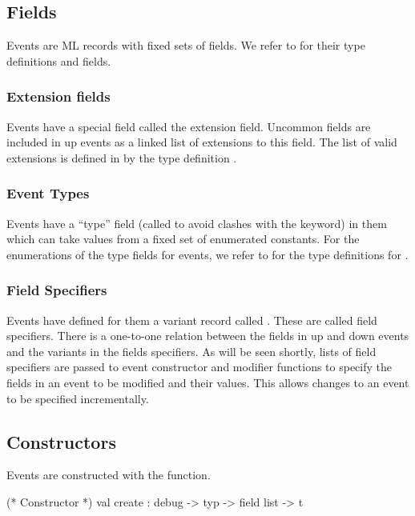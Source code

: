 \subsection{Fields}
Events are ML records with fixed sets of fields.  We refer to
 for their type definitions and fields.

\subsubsection{Extension fields}
Events have a special field called the extension field.  Uncommon
fields are included in up events as a linked list of extensions to
this field.  The list of valid extensions is defined in
 by the type definition .

\subsubsection{Event Types}
Events have a ``type'' field (called  to avoid clashes with
the  keyword) in them which can take values from a fixed
set of enumerated constants.  For the enumerations of the type fields
for events, we refer to  for the type
definitions for .

\subsubsection{Field Specifiers}
Events have defined for them a variant record called .
These are called field specifiers.  There is a one-to-one relation
between the fields in up and down events and the variants in the
fields specifiers.  As will be seen shortly, lists of field specifiers
are passed to event constructor and modifier functions to specify the
fields in an event to be modified and their values.  This allows
changes to an event to be specified incrementally.

\subsection{Constructors}
Events are constructed with the  function.

\begin{codebox}
  (* Constructor *)
val create	: debug -> typ -> field list -> t
\end{codebox}

